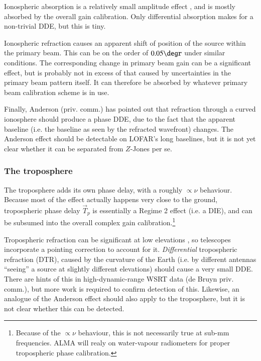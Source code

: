 \documentclass[]{aa}
\newcommand{\jones}[2]{\vec {#1}_{#2}}
\begin{document}
Ionospheric absorption is a relatively small amplitude effect \citep[e.g. 0.1 dB at 100 MHz and ZA=60$\degr$, see][]{tms}, and is mostly absorbed by the overall gain calibration. Only differential absorption makes for a non-trivial DDE, but this is tiny.

Ionospheric refraction causes an apparent shift of position of the source within the primary beam. This can be on the order of $0.05\degr$ under similar conditions. The corresponding change in primary beam gain can be a significant effect, but is probably not in excess of that caused by uncertainties in the primary beam pattern itself. It can therefore be absorbed by whatever primary beam calibration scheme is in use.

Finally, Anderson (priv. comm.) has pointed out that refraction through a curved ionosphere should produce a phase DDE, due to the fact that the apparent baseline (i.e. the baseline as seen by the refracted wavefront) changes. The Anderson effect should be detectable on LOFAR's long baselines, but it is not yet clear whether it can be separated from $Z$-Jones per se.
 
\subsubsection{The troposphere\label{sec:troposphere}}

The troposphere adds its own phase delay, with a roughly $\propto\nu$ behaviour. Because most of the effect actually happens very close to the ground, tropospheric phase delay $\jones{T}{p}$ is essentially a Regime 2 effect (i.e. a DIE), and can be subsumed into the overall complex gain calibration.\footnote{Because of the $\propto\nu$ behaviour, this is not necessarily true at sub-mm frequencies. ALMA will realy on water-vapour radiometers for proper tropospheric phase calibration.} 

Tropospheric refraction can be significant at low elevations \citep[Sect~10.1]{tms}, so telescopes incorporate a pointing correction to account for it. \emph{Differential} tropospheric refraction (DTR), caused by the curvature of the Earth (i.e. by different antennas ``seeing'' a source at slightly different elevations) should cause a very small DDE. There are hints of this in high-dynamic-range WSRT data (de Bruyn priv. comm.), but more work is required to confirm detection of this. Likewise, an analogue of the Anderson effect should also apply to the troposphere, but it is not clear whether this can be detected.
\end{document}
